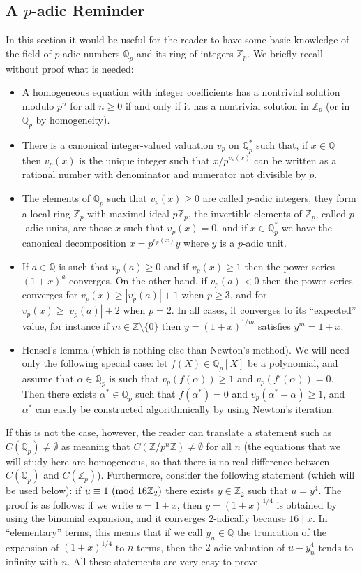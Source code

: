 \documentclass[12pt,a4paper]{article}
\newcommand{\Q}{{\mathbb Q}}
\newcommand{\Z}{{\mathbb Z}}
\newcommand{\al}{\alpha}
\renewcommand{\pmod}[1]{\allowbreak\ ({\rm{mod}}\,\,#1)}
\begin{document}
\subsection{A $p$-adic Reminder}

In this section it would be useful for the reader to have some basic knowledge
of the field of $p$-adic numbers $\Q_p$ and its ring of integers $\Z_p$. We 
briefly recall without proof what is needed:

\begin{itemize}\item A homogeneous equation with integer coefficients has
a nontrivial solution modulo $p^n$ for all $n\ge0$ if and only if it has a
nontrivial solution in $\Z_p$ (or in $\Q_p$ by homogeneity).
\item There is a canonical integer-valued valuation $v_p$ on $\Q_p^*$ such
that, if $x\in\Q$ then $v_p(x)$ is the unique integer such that $x/p^{v_p(x)}$
can be written as a rational number with denominator and numerator not 
divisible by $p$.
\item The elements of $\Q_p$ such that $v_p(x)\ge0$ are called $p$-adic
integers, they form a local ring $\Z_p$ with maximal ideal $p\Z_p$, the
invertible elements of $\Z_p$, called $p$-adic units, are those $x$ such that
$v_p(x)=0$, and if $x\in\Q_p^*$ we have the canonical decomposition
$x=p^{v_p(x)}y$ where $y$ is a $p$-adic unit.
\item If $a\in\Q$ is such that $v_p(a)\ge0$ and if $v_p(x)\ge1$ then the
power series $(1+x)^a$ converges. On the other hand, if $v_p(a)<0$ then
the power series converges for $v_p(x)\ge |v_p(a)|+1$ when $p\ge3$, and
for $v_p(x)\ge |v_p(a)|+2$ when $p=2$. In all cases, it converges to its
``expected'' value, for instance if $m\in\Z\setminus\{0\}$ then 
$y=(1+x)^{1/m}$ satisfies $y^m=1+x$.
\item Hensel's lemma (which is nothing else than Newton's method). We will 
need only the following special case: let $f(X)\in\Q_p[X]$ be a polynomial,
and assume that $\al\in\Q_p$ is such that $v_p(f(\al))\ge1$ and
$v_p(f'(\al))=0$. Then there exists $\al^*\in\Q_p$ such that $f(\al^*)=0$
and $v_p(\al^*-\al)\ge1$, and $\al^*$ can easily be constructed algorithmically
by using Newton's iteration.
\end{itemize}


 If this is not the case, however, the reader can 
translate a statement such as $C(\Q_p)\neq\emptyset$ as meaning that 
$C(\Z/p^n\Z)\neq\emptyset$ for all $n$ (the equations that we will study here 
are homogeneous, so that there is no real difference between $C(\Q_p)$ and 
$C(\Z_p)$). Furthermore, consider the following statement (which will be used
below): if $u\equiv1\pmod{16\Z_2}$ there exists $y\in\Z_2$ such that $u=y^4$.
The proof is as follows: if we write $u=1+x$, then $y=(1+x)^{1/4}$ is obtained
by using the binomial expansion, and it converges $2$-adically because
$16\mid x$. In ``elementary'' terms, this means that if we call 
$y_n\in\Q$ the truncation of the expansion of $(1+x)^{1/4}$ to $n$ terms,
then the $2$-adic valuation of $u-y_n^4$ tends to infinity with $n$. All
these statements are very easy to prove.
\end{document}
